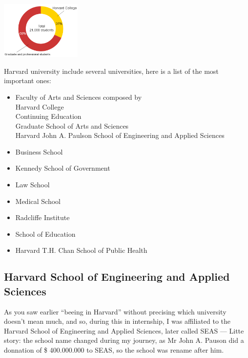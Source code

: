 \documentclass[10pt,a4paper]{article}
\begin{document}

\includegraphics[width=0.3\textwidth]{images/fig1.png}

Harvard university include several universities, here is a list of the most important ones:\\
\begin{itemize}
  \item Faculty of Arts and Sciences composed by \\Harvard College \\Continuing Education \\Graduate School of Arts and Sciences \\Harvard John A. Paulson School of Engineering and Applied Sciences
\item Business School
\item Kennedy School of Government
\item Law School
\item Medical School
\item Radcliffe Institute
\item School of Education
\item Harvard T.H. Chan School of Public Health
\end{itemize}


\subsection{Harvard School of Engineering and Applied Sciences}
As you saw earlier ``beeing in Harvard'' without precising which university doesn't mean much, and so, during this in internship, I was affiliated to the Harvard School of Engineering and Applied Sciences, later called SEAS — Litte story: the school name changed during my journey, as Mr John A. Pauson did a donnation of \$ 400.000.000 to SEAS, so the school was rename after him.\\
\end{document}
